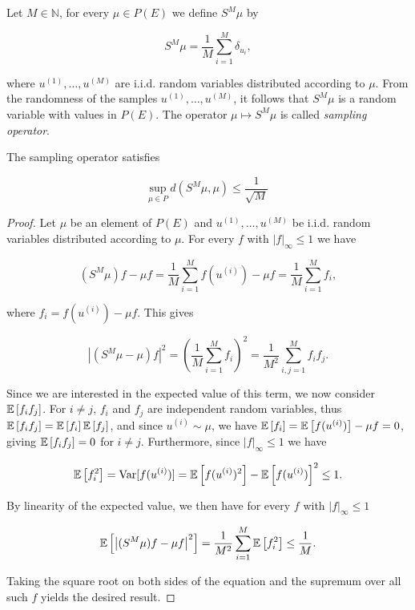 \begin{definition}
  Let $M \in \mathbb{N}$, for every $\mu \in P(E)$ we define $S^M\mu$ by

  \begin{equation*}
    S^M\mu = \frac1{M}\sum_{i=1}^M\delta_{u_i},
  \end{equation*}

  where $u^{(1)}, \ldots, u^{(M)}$ are i.i.d. random variables distributed according to $\mu$. From the randomness of the samples $u^{(1)}, \ldots, u^{(M)}$, it follows that $S^M\mu$ is a random variable with values in $P(E)$. The operator $\mu \mapsto S^M\mu$ is called \textit{sampling operator}.
\end{definition}

\begin{lemma}\label{sampling-bound}
  The sampling operator satisfies

  \begin{equation*}
    \underset{\mu \in P}{\text{sup}}\ d(S^M\mu, \mu) \le \frac1{\sqrt{M}}
  \end{equation*}
\end{lemma}

\begin{proof}
  Let $\mu$ be an element of $P(E)$ and $u^{(1)}, \ldots, u^{(M)}$ be i.i.d. random variables distributed according to $\mu$. For every $f$ with $|f|_\infty \le 1$ we have 
  
  \begin{equation*}
    (S^M\mu)f - \mu f = \frac1{M}\sum_{i=1}^Mf(u^{(i)}) - \mu f = \frac1{M}\sum_{i=1}^Mf_i,
  \end{equation*}

  where $f_i = f(u^{(i)}) - \mu f$. This gives

  \begin{equation*}
    \left|(S^M\mu - \mu)f\right|^2
    = \left(\frac1{M}\sum_{i=1}^Mf_i\right)^2
    = \frac1{M^2}\sum_{i,j=1}^Mf_if_j.
  \end{equation*}

  Since we are interested in the expected value of this term, we now consider $\mathbb{E}\left[f_if_j\right]$. For $i \neq j$, $f_i$ and $f_j$ are independent random variables, thus $\mathbb{E}\left[f_if_j\right] = \mathbb{E}\left[f_i\right]\mathbb{E}\left[f_j\right]$, and since $u^{(i)} \sim \mu$, we have $\mathbb{E}\left[f_i\right] = \mathbb{E}\left[f(u^{(i)})\right] - \mu f = 0$, giving $\mathbb{E}\left[f_if_j\right] = 0$ for $i \neq j$. Furthermore, since $|f|_\infty \le 1$ we have

  \begin{equation*}
    \mathbb{E}\left[f_i^2\right] = \text{Var}[f(u^{(i)})] = \mathbb{E}\left[f(u^{(i)})^2\right] - \mathbb{E}\left[f(u^{(i)})\right]^2 \leq 1.
  \end{equation*}

  By linearity of the expected value, we then have for every $f$ with $|f|_\infty \le 1$

  \begin{equation*}
    \mathbb{E}\left[\left|(S^M\mu)f - \mu f\right|^2\right] = \frac1{M^2}\sum_{i=1}^M\mathbb{E}\left[f_i^2\right] \le \frac1{M}.
  \end{equation*}

  Taking the square root on both sides of the equation and the supremum over all such $f$ yields the desired result.
\end{proof}

